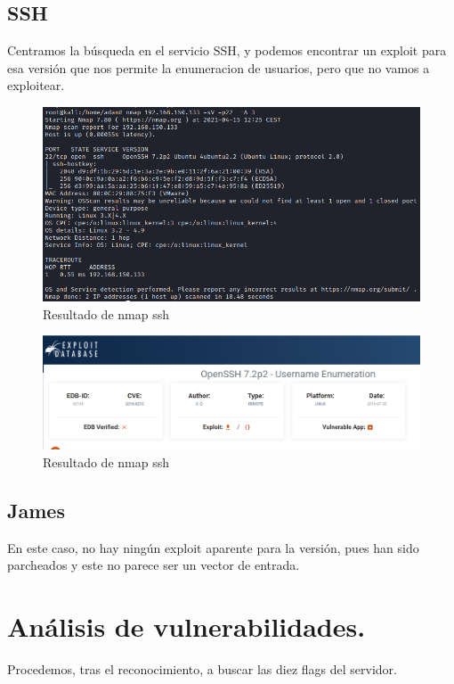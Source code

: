 \documentclass[12pt,twoside]{article}
\begin{document}
\subsection{SSH}
Centramos la búsqueda en el servicio SSH, y podemos encontrar un exploit para esa versión que nos permite la enumeracion de usuarios, pero que no vamos a exploitear. 
\begin{figure}[h]
    \centering
    \includegraphics[scale=0.7]{./imagenes/nmap_ssh}
    \caption{Resultado de nmap ssh}
\end{figure}

\begin{figure}[h]
    \centering
    \includegraphics[scale=0.7]{./imagenes/exploit_ssh}
    \caption{Resultado de nmap ssh}
\end{figure}

\subsection{James}
En este caso, no hay ningún exploit aparente para la versión, pues han sido parcheados y este no parece ser un vector de entrada.

\section{Análisis de vulnerabilidades.}
Procedemos, tras el reconocimiento, a buscar las diez flags del servidor. 
\end{document}
